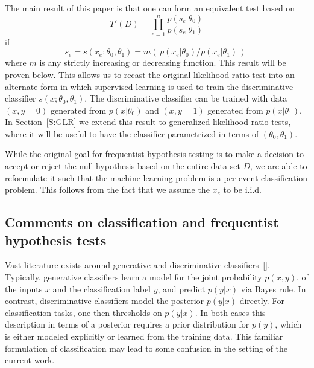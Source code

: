 \documentclass[aoas,preprint]{imsart}
\newcommand{\citek}[1]{[\cite{#1}]}
\numberwithin{equation}{section}
\theoremstyle{plain}
\begin{document}
The main result of this paper is that one can form an equivalent test based on 
\begin{equation}\label{eq:equivLRtest}
T'(D) = \prod_{e=1}^n \frac{ p(s_e | \theta_0)}{ p(s_e | \theta_1)}
\end{equation}
if 
\begin{equation}\label{eq:montonic}
s_e = s(x_e; \theta_0, \theta_1) = m\left(\, p(x_e|\theta_0) / p(x_e|\theta_1) \,\right) \; 
\end{equation}
where $m$ is any strictly increasing or decreasing function. This result will be proven below.
This allows us to recast the original likelihood ratio test into an alternate form in which supervised learning is used to train the discriminative classifier $s(x; \theta_0, \theta_1)$. The discriminative classifier can be trained with data $(x,y=0)$ generated 
from $p(x|\theta_0)$ and $(x,y=1)$ generated from $p(x|\theta_1)$. In Section~\ref{S:GLR} we extend this result to generalized likelihood ratio tests, where it will be useful to have the classifier  parametrized in terms of $(\theta_0, \theta_1)$.

While the original goal for frequentist hypothesis testing is to make a decision to accept or reject the null hypothesis based on the entire data set $D$, we are able to reformulate it such that the machine learning problem is a per-event classification problem. This follows from the fact that we assume the $x_e$ to be i.i.d.

\subsection{Comments on classification and frequentist hypothesis tests}

Vast literature exists around generative and discriminative classifiers~\citek{AndrewY.Ng}. Typically, generative classifiers learn a model for the joint probability $p(x,y)$, of the inputs $x$ and the classification label $y$, and predict $p(y|x)$ via Bayes rule. In contrast, discriminative classifiers model the posterior $p(y|x)$ directly. For classification tasks, one then thresholds on $p(y|x)$. In both cases this description in terms of a posterior requires a prior distribution for $p(y)$, which is either modeled explicitly or learned from the training data. 
This familiar formulation of classification may lead to some confusion in the setting of the current work. 
\end{document}
